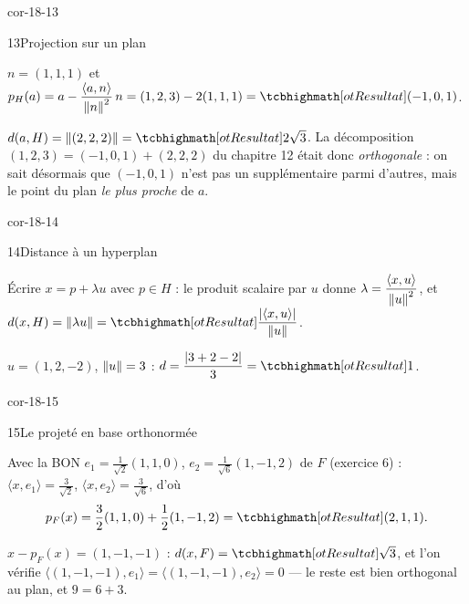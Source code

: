 \begin{blocLivre}{cor-18-13}
\begin{corrige}{13}{Projection sur un plan}
\begin{questions}
  \item $n=(1,1,1)$ et
    $p_H(a)=a-\dfrac{\langle a,n\rangle}{\norme{n}^{2}}\,n
    =(1,2,3)-2(1,1,1)=\res{(-1,0,1)}$.
  \item $d(a,H)=\norme{(2,2,2)}=\res{2\sqrt3}$. La décomposition
    $(1,2,3)=(-1,0,1)+(2,2,2)$ du chapitre 12 était donc
    \emph{orthogonale} : on sait désormais que $(-1,0,1)$ n'est pas un
    supplémentaire parmi d'autres, mais le point du plan \emph{le plus
    proche} de $a$.
\end{questions}
\end{corrige}
\end{blocLivre}

\begin{blocLivre}{cor-18-14}
\begin{corrige}{14}{Distance à un hyperplan}
\begin{questions}
  \item Écrire $x=p+\lambda u$ avec $p\in H$ : le produit scalaire par
    $u$ donne $\lambda=\dfrac{\langle x,u\rangle}{\left\lVert u\right\rVert^{2}}$, et
    $d(x,H)=\norme{\lambda u}
    =\res{\dfrac{|\langle x,u\rangle|}{\norme{u}}}$.
  \item $u=(1,2,-2)$, $\left\lVert u\right\rVert=3$ :
    $d=\dfrac{|3+2-2|}{3}=\res{1}$.
\end{questions}
\end{corrige}
\end{blocLivre}

\begin{blocLivre}{cor-18-15}
\begin{corrige}{15}{Le projeté en base orthonormée}
\begin{questions}
  \item Avec la BON $e_1=\frac{1}{\sqrt2}(1,1,0)$,
    $e_2=\frac{1}{\sqrt6}(1,-1,2)$ de $F$ (exercice 6) :
    $\langle x,e_1\rangle=\frac{3}{\sqrt2}$,
    $\langle x,e_2\rangle=\frac{3}{\sqrt6}$, d'où
    \[
    p_F(x)=\frac32(1,1,0)+\frac12(1,-1,2)=\res{(2,1,1)} .
    \]
  \item $x-p_F(x)=(1,-1,-1)$ : $d(x,F)=\res{\sqrt3}$, et l'on vérifie
    $\langle(1,-1,-1),e_1\rangle=\langle(1,-1,-1),e_2\rangle=0$ — le
    reste est bien orthogonal au plan, et $9=6+3$.
\end{questions}
\end{corrige}
\end{blocLivre}

